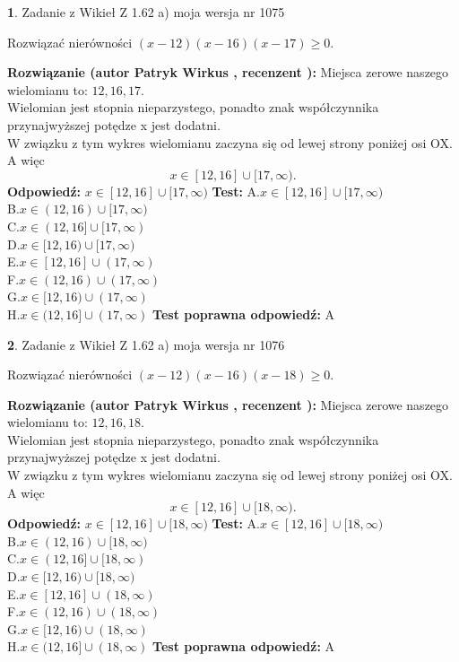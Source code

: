 \documentclass[12pt, a4paper]{article}
\theoremstyle{definition} %
\newtheorem{zad}{}
\newcommand{\zadStart}[1]{\begin{zad}#1\newline}
\newcommand{\zadStop}{\end{zad}}
\newcommand{\rozwStart}[2]{\noindent \textbf{Rozwiązanie (autor #1 , recenzent #2): }\newline}
\newcommand{\rozwStop}{\newline}
\newcommand{\odpStart}{\noindent \textbf{Odpowiedź:}\newline}
\newcommand{\odpStop}{\newline}
\newcommand{\testStart}{\noindent \textbf{Test:}\newline}
\newcommand{\testStop}{\newline}
\newcommand{\kluczStart}{\noindent \textbf{Test poprawna odpowiedź:}\newline}
\newcommand{\kluczStop}{\newline}
\begin{document}
\zadStart{Zadanie z Wikieł Z 1.62 a) moja wersja nr 1075}

Rozwiązać nierówności $(x-12)(x-16)(x-17)\ge0$.
\zadStop
\rozwStart{Patryk Wirkus}{}
Miejsca zerowe naszego wielomianu to: $12, 16, 17$.\\
Wielomian jest stopnia nieparzystego, ponadto znak współczynnika przy\linebreak najwyższej potędze x jest dodatni.\\ W związku z tym wykres wielomianu zaczyna się od lewej strony poniżej osi OX. A więc $$x \in [12,16] \cup [17,\infty).$$
\rozwStop
\odpStart
$x \in [12,16] \cup [17,\infty)$
\odpStop
\testStart
A.$x \in [12,16] \cup [17,\infty)$\\
B.$x \in (12,16) \cup [17,\infty)$\\
C.$x \in (12,16] \cup [17,\infty)$\\
D.$x \in [12,16) \cup [17,\infty)$\\
E.$x \in [12,16] \cup (17,\infty)$\\
F.$x \in (12,16) \cup (17,\infty)$\\
G.$x \in [12,16) \cup (17,\infty)$\\
H.$x \in (12,16] \cup (17,\infty)$
\testStop
\kluczStart
A
\kluczStop



\zadStart{Zadanie z Wikieł Z 1.62 a) moja wersja nr 1076}

Rozwiązać nierówności $(x-12)(x-16)(x-18)\ge0$.
\zadStop
\rozwStart{Patryk Wirkus}{}
Miejsca zerowe naszego wielomianu to: $12, 16, 18$.\\
Wielomian jest stopnia nieparzystego, ponadto znak współczynnika przy\linebreak najwyższej potędze x jest dodatni.\\ W związku z tym wykres wielomianu zaczyna się od lewej strony poniżej osi OX. A więc $$x \in [12,16] \cup [18,\infty).$$
\rozwStop
\odpStart
$x \in [12,16] \cup [18,\infty)$
\odpStop
\testStart
A.$x \in [12,16] \cup [18,\infty)$\\
B.$x \in (12,16) \cup [18,\infty)$\\
C.$x \in (12,16] \cup [18,\infty)$\\
D.$x \in [12,16) \cup [18,\infty)$\\
E.$x \in [12,16] \cup (18,\infty)$\\
F.$x \in (12,16) \cup (18,\infty)$\\
G.$x \in [12,16) \cup (18,\infty)$\\
H.$x \in (12,16] \cup (18,\infty)$
\testStop
\kluczStart
A
\kluczStop
\end{document}
